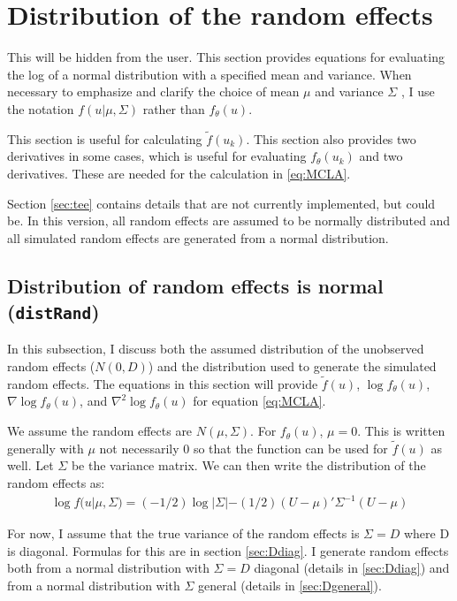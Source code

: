 \documentclass{article}
\begin{document}
\section{Distribution of the random effects }
This will be hidden from the user.  This section provides equations for evaluating the log of a normal distribution with a specified mean and variance. When necessary to emphasize and clarify the choice of mean $\mu$ and variance $\Sigma$ , I use the notation $ f(u|\mu,\Sigma)$ rather than $f_\theta(u)$.

This section is useful for calculating $\tilde{f}(u_k)$.  This section also provides two derivatives in some cases, which is useful for evaluating $f_\theta(u_k)$ and two derivatives. These are needed for the calculation in \eqref{eq:MCLA}.

Section \ref{sec:tee} contains details that are not currently implemented, but could be. In this version, all random effects are assumed to be normally distributed and all simulated random effects are generated from a normal distribution.


\subsection{Distribution of random effects is normal (\texttt{distRand})}\label{sec:distRand}
In this subsection, I discuss both the assumed distribution of the unobserved random effects ($N(0,D)$) and the distribution used to generate the simulated random effects.  The equations in this section will provide $\tilde{f}(u)$, $\log f_\theta(u)$, $\nabla \log f_\theta(u)$, and $\nabla^2 \log f_\theta(u)$ for equation \ref{eq:MCLA}. 

We assume the random effects are $N(\mu, \Sigma)$. For $f_\theta(u)$, $\mu=0$. This is written generally with $\mu$ not necessarily $0$ so that the function can be used for $\tilde{f}(u)$ as well. Let $\Sigma$ be the variance matrix. We can then write the distribution of the random effects as:
\begin{align}
\log f (u| \mu, \Sigma) = (-1/2) \log |\Sigma| - (1/2) (U-\mu)' \Sigma^{-1} (U-\mu)
\end{align}

For now, I  assume that the true variance of the random effects is $\Sigma=D$ where D is diagonal. Formulas for this are in section \ref{sec:Ddiag}.  I generate random effects both from a normal distribution with $\Sigma=D$ diagonal (details in \ref{sec:Ddiag}) and from a normal distribution with $\Sigma$ general (details in \ref{sec:Dgeneral}).
\end{document}

